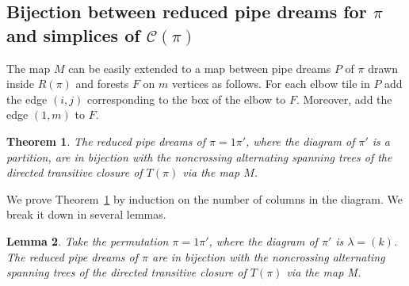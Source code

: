 \documentclass[10pt]{amsart}
\newtheorem{theo}{Theorem}[section]
\newtheorem{lemm}[theo]{Lemma}
\theoremstyle{definition}
\numberwithin{equation}{section}
\newcommand*\C{{\mathcal{C}}}
\newcommand*\+{\smash{\lower2pt\hbox{\rlap{\vrule height14pt}}\raise2pt\hbox{\rlap{\hskip-3pt \vrule height.4pt depth0pt width14.7pt}}}}
\begin{document}
\subsection{Bijection between reduced pipe dreams for \texorpdfstring{$\pi$}{pi} and simplices of \texorpdfstring{$\C(\pi)$}{C(pi)}}

The map $M$ can be easily extended to a map between pipe dreams $P$ of $\pi$ drawn inside $R(\pi)$ and forests $F$ on $m$ vertices as follows. For each elbow tile in $P$ add the edge $(i,j)$ corresponding to the box of the elbow to $F$. Moreover, add the edge $(1,m)$ to $F$.

\begin{theo}\label{thm:bij}
The reduced pipe dreams of $\pi=1\pi'$, where the diagram of $\pi'$ is a partition, are in bijection with the noncrossing alternating spanning trees of the directed transitive closure of $T(\pi)$ via the map $M$.
\end{theo}

We prove Theorem~\ref{thm:bij} by induction on the number of columns in the diagram. We break it down in several lemmas.

\begin{lemm}\label{lem:base}
Take the permutation $\pi=1\pi'$, where the diagram of $\pi'$ is $\lambda=(k)$. The reduced pipe dreams of $\pi$ are in bijection with the noncrossing alternating spanning trees of the directed transitive closure of $T(\pi)$ via the map M.
\end{lemm}
\end{document}
